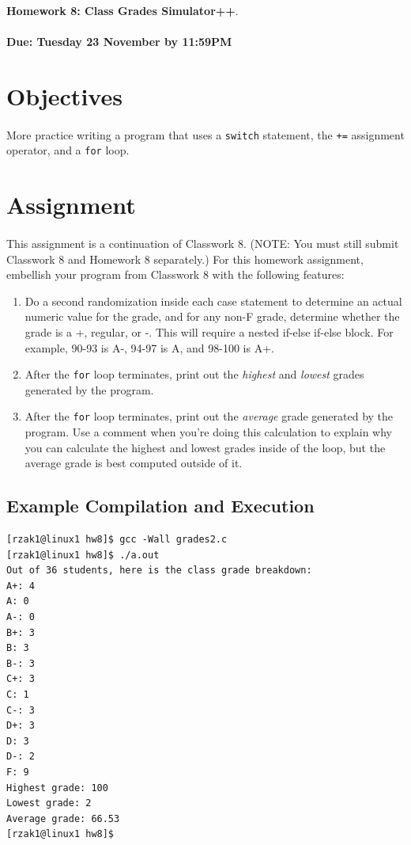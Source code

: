 \documentclass[letter,11pt]{article}
\begin{document}
\huge
\textbf{Homework 8: Class Grades Simulator++}.
\normalsize
\\ ~~ \\
\textbf{Due: Tuesday 23 November by 11:59PM}

\section*{Objectives}
\paragraph{}More practice writing a program that uses a \texttt{switch} statement, the \texttt{+=} assignment operator, and a \texttt{for} loop.

\section*{Assignment}
\paragraph{}This assignment is a continuation of Classwork 8. (NOTE: You must still submit Classwork 8 and Homework 8 separately.) For this homework assignment, embellish your program from Classwork 8 with the following features:
\begin{enumerate}
    \item Do a second randomization inside each case statement to determine an actual numeric value for the grade, and for any non-F grade, determine whether the grade is a +, regular, or -. This will require a nested if-else if-else block. For example, 90-93 is A-, 94-97 is A, and 98-100 is A+.
    \item After the \texttt{for} loop terminates, print out the \textit{highest} and \textit{lowest} grades generated by the program.
    \item After the \texttt{for} loop terminates, print out the \textit{average} grade generated by the program. Use a comment when you're doing this calculation to explain why you can calculate the highest and lowest grades inside of the loop, but the average grade is best computed outside of it.
\end{enumerate}

\subsection*{Example Compilation and Execution}
\begin{verbatim}
[rzak1@linux1 hw8]$ gcc -Wall grades2.c
[rzak1@linux1 hw8]$ ./a.out
Out of 36 students, here is the class grade breakdown:
A+: 4
A: 0
A-: 0
B+: 3
B: 3
B-: 3
C+: 3
C: 1
C-: 3
D+: 3
D: 3
D-: 2
F: 9
Highest grade: 100
Lowest grade: 2
Average grade: 66.53
[rzak1@linux1 hw8]$ 
\end{verbatim}
\end{document}
